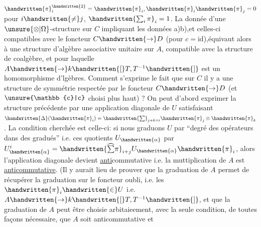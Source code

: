 $\handwritten{\pi}_i^{\handwritten{2}}=\handwritten{\pi}_i,\handwritten{\pi}_i\handwritten{\pi}_j=0$ pour $i\handwritten{\ne}j$, $\handwritten{\sum_i\pi}_i=1$. La donnée d'une $\unsure{\otimes|\Omega}$-structure sur $C$ impliquant les données a)b),et celles-ci compatibles avec le foncteur $C\handwritten{\to}D$ (pour $c=\mathrm{id}$),équivaut alors à une structure d'algèbre associative unitaire sur $A$, compatible avec la structure de coalgèbre, et pour laquelle $A\handwritten{\to}k\handwritten{[}T,T^{-1}\handwritten{]}$ est un homomorphisme d'lgèbres. Comment s'exprime le fait que  sur $C$ il y a une structure de symmétrie  respectée par le foncteur $C\handwritten{\to}D$ (et $\unsure{\mathbb{c}|c}$ choisi plus haut) ? On peut d'abord exprimer la structure précédente par une application diagonale de $U$ satisfaisant $\handwritten{\Delta}(\handwritten{\pi}_i)=\handwritten{\sum}_{j+k=i}\handwritten{\pi}_j\otimes\handwritten{\pi}_k$. La condition cherchée  est celle-ci: si nous graduons $U$ par ``degré des opérateurs dans des gradués'' i.e.  ces quotients $U_{\handwritten{\alpha}}$ par $U_{\handwritten{\alpha}}^i=\handwritten{\widehat{\sum}\pi}_{i+j}U_{\handwritten{\alpha}}\handwritten{\pi}_i$, alors l'application diagonale devient \uline{anti}commutative i.e. la muttiplication de $A$  est \uline{anticommutative}. (Il y aurait lieu de prouver que la graduation de $A$ permet de récupérer la  graduation sur le foncteur oubli, i.e. les $\handwritten{\pi}_i\handwritten{\in}U$ i.e. $A\handwritten{\to}k\handwritten{[}T,T^{-1}\handwritten{]}$, et que la graduation de $A$  peut être choisie arbitaieement, avec la seule condition, de toutes façons nécessaire, que $A$ soit anticommutative et 